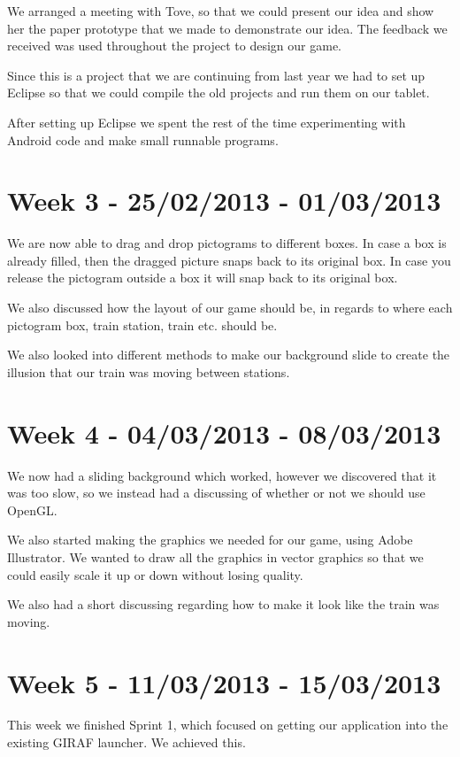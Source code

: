 We arranged a meeting with Tove, so that we could present our idea and show her the paper prototype that we made to demonstrate our idea. The feedback we received was used throughout the project to design our game.

Since this is a project that we are continuing from last year we had to set up Eclipse so that we could compile the old projects and run them on our tablet. 

After setting up Eclipse we spent the rest of the time experimenting with Android code and make small runnable programs. 

\section*{Week 3 - 25/02/2013 - 01/03/2013}

We are now able to drag and drop pictograms to different boxes. In case a box is already filled, then the dragged picture snaps back to its original box. In case you release the pictogram outside a box it will snap back to its original box. 

We also discussed how the layout of our game should be, in regards to where each pictogram box, train station, train etc. should be. 

We also looked into different methods to make our background slide to create the illusion that our train was moving between stations. 

\section*{Week 4 - 04/03/2013 - 08/03/2013}
We now had a sliding background which worked, however we discovered that it was too slow, so we instead had a discussing of whether or not we should use OpenGL. 

We also started making the graphics we needed for our game, using Adobe Illustrator. We wanted to draw all the graphics in vector graphics so that we could easily scale it up or down without losing quality. 

We also had a short discussing regarding how to make it look like the train was moving. 

\section*{Week 5 - 11/03/2013 - 15/03/2013}
This week we finished Sprint 1, which focused on getting our application into the existing GIRAF launcher. We achieved this. 

